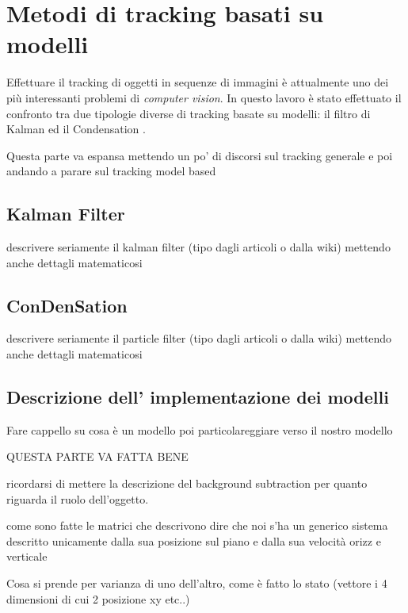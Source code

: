 \chapter{Metodi di tracking basati su modelli}
Effettuare il tracking di oggetti in sequenze di immagini è attualmente uno dei più interessanti problemi di \textit{computer vision}. In questo lavoro è stato effettuato il confronto tra due tipologie diverse di tracking basate su modelli: il filtro di Kalman \cite{kalman-intro} ed il Condensation \cite{condensation}.

Questa parte va espansa mettendo un po' di discorsi sul tracking generale e poi andando a parare sul tracking model based

\section{Kalman Filter}
descrivere seriamente il kalman filter (tipo dagli articoli o dalla wiki) mettendo anche dettagli matematicosi

\section{ConDenSation}
descrivere seriamente il particle filter (tipo dagli articoli o dalla wiki) mettendo anche dettagli matematicosi

\section{Descrizione dell' implementazione dei modelli}
Fare cappello su cosa è un modello poi particolareggiare verso il nostro modello

QUESTA PARTE VA FATTA BENE

ricordarsi di mettere la descrizione del background subtraction per quanto riguarda il ruolo dell'oggetto.

come sono fatte le matrici che descrivono 
dire che noi s'ha un generico sistema descritto unicamente dalla sua posizione sul piano e dalla sua velocità orizz e verticale

Cosa si prende per varianza di uno dell'altro, come è fatto lo stato (vettore i 4 dimensioni di cui 2 posizione xy etc..)

